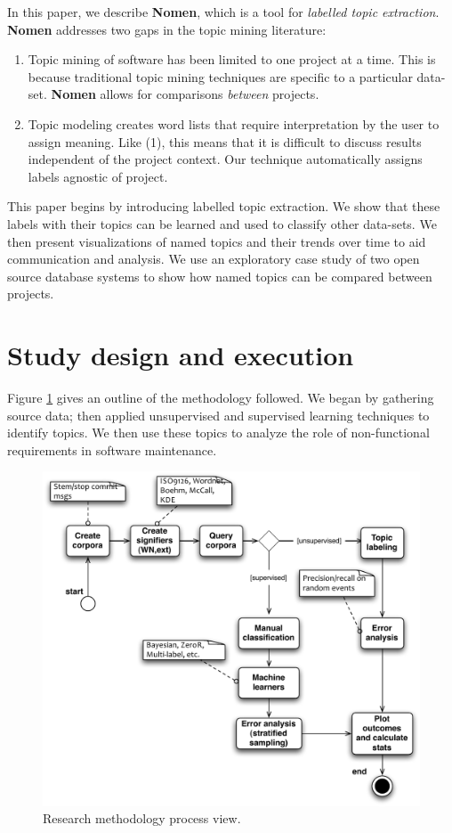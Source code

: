 \documentclass[]{sig-alternate}
\begin{document}
In this paper, we describe \textbf{Nomen}, which is a tool for \emph{labelled topic extraction}. \textbf{Nomen} addresses two gaps in the topic mining literature:
\begin{enumerate}
  \item Topic mining of software has been limited to one project at a time. This is because traditional topic mining techniques are specific to a particular data-set. \textbf{Nomen} allows for comparisons \textit{between} projects. 
  \item Topic modeling creates word lists that require interpretation by the user to assign meaning. Like (1), this means
that it is difficult to discuss results independent of the project context. Our technique automatically assigns labels agnostic of project.
\end{enumerate}

This paper begins by introducing labelled topic extraction. We show that these labels with their topics can be learned and used to classify other data-sets. We then present visualizations of named topics and their trends over time to aid communication and analysis. We use an exploratory case study of two open source database systems to show how named topics can be compared between projects.


\section{Study design and execution}
Figure \ref{fig:process} gives an outline of the methodology followed. We began by gathering source data; then applied unsupervised and supervised learning techniques to identify topics. We then use these topics to analyze the role of non-functional requirements in software maintenance.

\begin{figure}
  \centering
 \includegraphics[width=.45\textwidth]{figures/process-model}
 \caption{Research methodology process view.}
  \label{fig:process}
\end{figure}
\end{document}
